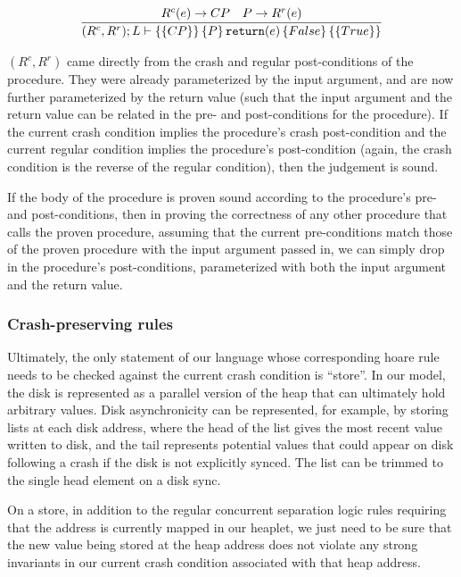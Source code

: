 \begin{gather*}
    \infer{\hoarestmt{(R^c,R^r)}{L}{CP}{P}{\texttt{return}(e)}{False}{True}}
	  {R^c(e) \imp CP & P \imp R^r(e)}
\end{gather*}

$(R^c,R^r)$ came directly from the crash and regular post-conditions of the
procedure.
They were already parameterized by the input argument, and are now
further parameterized by the return value (such that the input argument and the
return value can be related in the pre- and post-conditions for the procedure).
If the current crash condition implies the procedure's crash post-condition and
the current regular condition implies the procedure's post-condition (again, the
crash condition is the reverse of the regular condition), then the judgement is
sound.

If the body of the procedure is proven sound according to the procedure's pre-
and post-conditions, then in proving the correctness of any other procedure that calls
the proven procedure, assuming that the current pre-conditions
match those of the proven procedure with the input argument passed in,
we can simply drop in the procedure's post-conditions, parameterized with both
the input argument and the return value.

\subsubsection{Crash-preserving rules}


Ultimately, the only statement of our language whose corresponding hoare rule
needs to be checked against the current crash condition is ``store''.
In our
model, the disk is represented as a parallel version of the heap that can
ultimately hold arbitrary values.
Disk asynchronicity can be represented, for
example, by storing lists at each disk address, where the head of the list gives
the most recent value written to disk, and the tail represents potential values
that could appear on disk following a crash if the disk is not explicitly synced.
The list can be trimmed to the single head element on a disk sync.

On a store, in addition to the regular concurrent separation logic rules
requiring that the address is currently mapped in our heaplet, we just need to
be sure that the new value being stored at the heap address does not violate any
strong invariants in our current crash condition associated with that heap
address.

